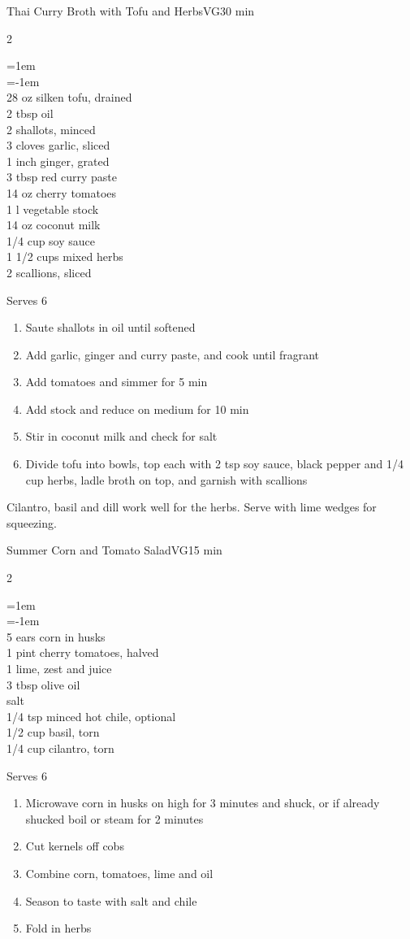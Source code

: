 \documentclass{article}
\newenvironment{recipe}[3][]
    {\begin{cardbase}[#1]{#2}{#3}
    \columnratio{0.333}
    \begin{paracol}{2}}
    {\end{paracol}\end{cardbase}}
\newenvironment{denserecipe}[3][]
    {\small
    \begin{recipe}[#1]{#2}{#3}}
    {\end{recipe}}
\newcommand{\nextcolumn}{\switchcolumn}
\newenvironment{ingredients}
    {
    \begin{obeylines}
    \vspace{\parskip}
    \setlength{\parskip}{0.25em}
    \vspace{-0.25em}
    \leftskip=1em
    \parindent=-1em}
    {\end{obeylines}}
\newenvironment{steps}
    {\begin{enumerate}[leftmargin=*,topsep=0pt]}
    {\end{enumerate}}
\newcommand{\tag}[1]{\hspace{1em}#1}
\newcommand{\symboltag}[2]{\tag{#1\hspace{0.4em}#2}}
\newcommand{\totaltime}[1]{\symboltag{\raisebox{-0.1em}{\small\StopWatchEnd}}{#1}}
\begin{document}
\begin{denserecipe}{Thai Curry Broth with Tofu and Herbs}{\tag{VG}\totaltime{30 min}}
\begin{ingredients}
28 oz silken tofu, drained
2 tbsp oil
2 shallots, minced
3 cloves garlic, sliced
1 inch ginger, grated
3 tbsp red curry paste
14 oz cherry tomatoes
1 l vegetable stock
14 oz coconut milk
1/4 cup soy sauce
1 1/2 cups mixed herbs
2 scallions, sliced
\end{ingredients}
\nextcolumn
Serves 6
\begin{steps}
    \item Saute shallots in oil until softened
    \item Add garlic, ginger and curry paste, and cook until fragrant
    \item Add tomatoes and simmer for 5 min
    \item Add stock and reduce on medium for 10 min
    \item Stir in coconut milk and check for salt
    \item Divide tofu into bowls, top each with 2 tsp soy sauce, black pepper and 1/4 cup herbs, ladle broth on top, and garnish with scallions
\end{steps}
Cilantro, basil and dill work well for the herbs. Serve with lime wedges for squeezing.
\end{denserecipe}

\begin{recipe}{Summer Corn and Tomato Salad}{\tag{VG}\totaltime{15 min}}
\begin{ingredients}
5 ears corn in husks
1 pint cherry tomatoes, halved
1 lime, zest and juice
3 tbsp olive oil
salt
1/4 tsp minced hot chile, optional
1/2 cup basil, torn
1/4 cup cilantro, torn
\end{ingredients}
\nextcolumn
Serves 6
\begin{steps}
    \item Microwave corn in husks on high for 3 minutes and shuck, or if already shucked boil or steam for 2 minutes
    \item Cut kernels off cobs
    \item Combine corn, tomatoes, lime and oil
    \item Season to taste with salt and chile
    \item Fold in herbs
\end{steps}
\end{recipe}
\end{document}
